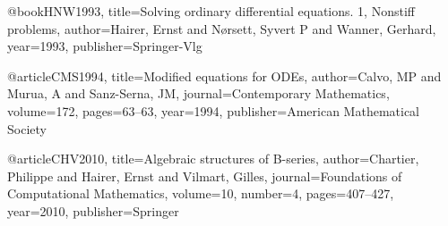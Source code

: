 @book{HNW1993,
  title={Solving ordinary differential equations. 1, Nonstiff problems},
  author={Hairer, Ernst and N{\o}rsett, Syvert P and Wanner, Gerhard},
  year={1993},
  publisher={Springer-Vlg}
}

@article{CMS1994,
  title={Modified equations for ODEs},
  author={Calvo, MP and Murua, A and Sanz-Serna, JM},
  journal={Contemporary Mathematics},
  volume={172},
  pages={63--63},
  year={1994},
  publisher={American Mathematical Society}
}

@article{CHV2010,
  title={Algebraic structures of B-series},
  author={Chartier, Philippe and Hairer, Ernst and Vilmart, Gilles},
  journal={Foundations of Computational Mathematics},
  volume={10},
  number={4},
  pages={407--427},
  year={2010},
  publisher={Springer}
}
